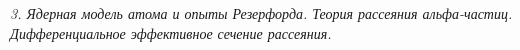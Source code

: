 \emph{3. Ядерная модель атома и опыты Резерфорда. Теория рассеяния 
альфа-частиц. Дифференциальное эффективное сечение рассеяния.}

\newpage
